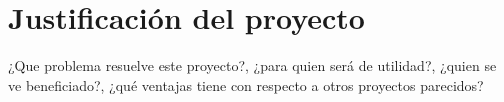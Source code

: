 \section{Justificación del proyecto} 
¿Que problema resuelve este proyecto?, ¿para quien será de utilidad?, ¿quien se ve beneficiado?, ¿qué  ventajas tiene con respecto a otros proyectos parecidos?





